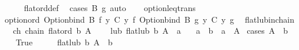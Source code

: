 \begin{isabellebody}
\ \ \ \ \isamarkupfalse%
\ flat{\isacharunderscore}{\kern0pt}ord{\isacharunderscore}{\kern0pt}def\ \isamarkupfalse%
\ {\isacharparenleft}{\kern0pt}cases\ {\isachardoublequoteopen}B\ g{\isachardoublequoteclose}{\isacharparenright}{\kern0pt}\ auto\isanewline
\ \ \isamarkupfalse%
\ {\isacharparenleft}{\kern0pt}option{\isachardot}{\kern0pt}leq{\isacharunderscore}{\kern0pt}trans{\isacharparenright}{\kern0pt}\isanewline
\ \ \isamarkupfalse%
\ {\isachardoublequoteopen}option{\isacharunderscore}{\kern0pt}ord\ {\isacharparenleft}{\kern0pt}Option{\isachardot}{\kern0pt}bind\ {\isacharparenleft}{\kern0pt}B\ f{\isacharparenright}{\kern0pt}\ {\isacharparenleft}{\kern0pt}{\isasymlambda}y{\isachardot}{\kern0pt}\ C\ y\ f{\isacharparenright}{\kern0pt}{\isacharparenright}{\kern0pt}\ {\isacharparenleft}{\kern0pt}Option{\isachardot}{\kern0pt}bind\ {\isacharparenleft}{\kern0pt}B\ g{\isacharparenright}{\kern0pt}\ {\isacharparenleft}{\kern0pt}{\isasymlambda}y{\isacharprime}{\kern0pt}{\isachardot}{\kern0pt}\ C\ y{\isacharprime}{\kern0pt}\ g{\isacharparenright}{\kern0pt}{\isacharparenright}{\kern0pt}{\isachardoublequoteclose}\ \isacommand{{\isachardot}{\kern0pt}}\isamarkupfalse%
\isanewline
{}\isamarkupfalse%
%
\endisatagproof
{\isafoldproof}%
%
\isadelimproof
\isanewline
%
\endisadelimproof
\isanewline
{}\isamarkupfalse%
\ flat{\isacharunderscore}{\kern0pt}lub{\isacharunderscore}{\kern0pt}in{\isacharunderscore}{\kern0pt}chain{\isacharcolon}{\kern0pt}\isanewline
\ \ \ ch{\isacharcolon}{\kern0pt}\ {\isachardoublequoteopen}chain\ {\isacharparenleft}{\kern0pt}flat{\isacharunderscore}{\kern0pt}ord\ b{\isacharparenright}{\kern0pt}\ A\ {\isachardoublequoteclose}\isanewline
\ \ \ lub{\isacharcolon}{\kern0pt}\ {\isachardoublequoteopen}flat{\isacharunderscore}{\kern0pt}lub\ b\ A\ {\isacharequal}{\kern0pt}\ a{\isachardoublequoteclose}\isanewline
\ \ \ {\isachardoublequoteopen}a\ {\isacharequal}{\kern0pt}\ b\ {\isasymor}\ a\ {\isasymin}\ A{\isachardoublequoteclose}\isanewline
%
\isadelimproof
%
\endisadelimproof
%
\isatagproof
{}\isamarkupfalse%
\ {\isacharparenleft}{\kern0pt}cases\ {\isachardoublequoteopen}A\ {\isasymsubseteq}\ {\isacharbraceleft}{\kern0pt}b{\isacharbraceright}{\kern0pt}{\isachardoublequoteclose}{\isacharparenright}{\kern0pt}\isanewline
\ \ \isamarkupfalse%
\ True\isanewline
\ \ \isamarkupfalse%
\ \isamarkupfalse%
\ {\isachardoublequoteopen}flat{\isacharunderscore}{\kern0pt}lub\ b\ A\ {\isacharequal}{\kern0pt}\ b{\isachardoublequoteclose}\ \isamarkupfalse%

\end{isabellebody}
